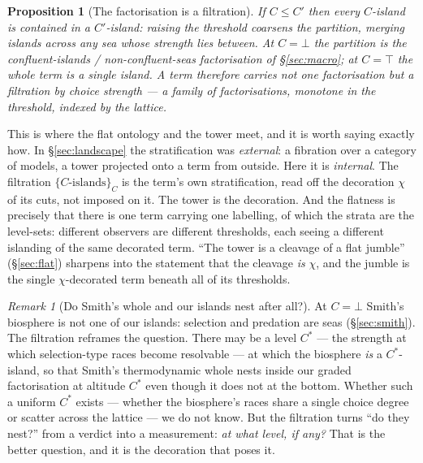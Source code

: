 \documentclass[11pt]{article}
\theoremstyle{definition}
\theoremstyle{plain}
\newtheorem{proposition}{Proposition}
\theoremstyle{remark}
\newtheorem{remark}{Remark}
\begin{document}
\begin{proposition}[The factorisation is a filtration]\label{prop:filtration}
If $C \le C'$ then every $C$-island is contained in a $C'$-island: raising the threshold coarsens
the partition, merging islands across any sea whose strength lies between. At $C = \bot$ the
partition is the confluent-islands / non-confluent-seas factorisation of \S\ref{sec:macro}; at
$C = \top$ the whole term is a single island. A term therefore carries not one factorisation but a
\emph{filtration by choice strength} --- a family of factorisations, monotone in the threshold,
indexed by the lattice.
\end{proposition}

This is where the flat ontology and the tower meet, and it is worth saying exactly how. In
\S\ref{sec:landscape} the stratification was \emph{external}: a fibration over a category of models,
a tower projected onto a term from outside. Here it is \emph{internal}. The filtration
$\{C\text{-islands}\}_{C}$ is the term's own stratification, read off the decoration $\chi$ of its
cuts, not imposed on it. The tower is the decoration. And the flatness is precisely that there is
one term carrying one labelling, of which the strata are the level-sets: different observers are
different thresholds, each seeing a different islanding of the same decorated term. ``The tower is a
cleavage of a flat jumble'' (\S\ref{sec:flat}) sharpens into the statement that the cleavage
\emph{is} $\chi$, and the jumble is the single $\chi$-decorated term beneath all of its thresholds.

\begin{remark}[Do Smith's whole and our islands nest after all?]\label{rmk:nest}
At $C = \bot$ Smith's biosphere is not one of our islands: selection and predation are seas
(\S\ref{sec:smith}). The filtration reframes the question. There may be a level $C^{*}$ --- the
strength at which selection-type races become resolvable --- at which the biosphere \emph{is} a
$C^{*}$-island, so that Smith's thermodynamic whole nests inside our graded factorisation at
altitude $C^{*}$ even though it does not at the bottom. Whether such a uniform $C^{*}$ exists ---
whether the biosphere's races share a single choice degree or scatter across the lattice --- we do
not know. But the filtration turns ``do they nest?'' from a verdict into a measurement: \emph{at
what level, if any?} That is the better question, and it is the decoration that poses it.
\end{remark}
\end{document}
